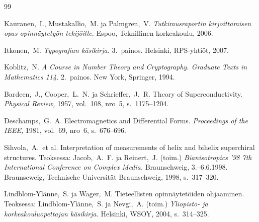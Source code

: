 \documentclass[english,12pt,a4paper,pdftex,sci,utf8]{aaltothesis}
\begin{document}
{}
\begin{thebibliography}{99}

 Kauranen,\ I., Mustakallio,\ M. ja Palmgren,\ V.
  \textit{Tutkimusraportin kirjoittamisen opas opinn\"aytety\"on
    tekij\"oille.}  Espoo, Teknillinen korkeakoulu, 2006.

 Itkonen,\ M. \textit{Typografian k\"asikirja.} 3.\
  painos.  Helsinki, RPS-yhti\"ot, 2007.

 Koblitz,\ N. \textit{A Course in Number Theory and
    Cryptography. Graduate Texts in Mathematics 114.}  2.\ painos. New
  York, Springer, 1994.

\bibitem{bcs} Bardeen,\ J., Cooper,\ L.\ N. ja Schrieffer,\ J.\ R.
  Theory of Superconductivity. \textit{Physical Review,} 1957, vol.\
  108, nro~5, s.\ 1175--1204.

 Deschamps,\ G.\ A. Electromagnetics and
  Differential Forms. \textit{Proceedings of the IEEE,} 1981, vol.\
  69, nro~6, s.\ 676--696.

\bibitem{Sihvola} Sihvola,\ A.\ et al.
  Interpretation of measurements of helix 
    and bihelix superchiral structures.
  Teoksessa: Jacob,\ A.\ F. ja
  Reinert,\ J. (toim.) \textit{Bianisotropics '98 7th International
    Conference on Complex Media.}  Braunschweig, 3.--6.6.1998.
  Braunscweig, Technische Universit\"at Braunschweig, 1998, s.\
  317--320.

 Lindblom-Yl\"anne,\ S. ja Wager,\ M.  Tieteellisten
  opinn\"aytet\"oiden ohjaaminen. Teoksessa: Lindblom-Yl\"anne,\ S. ja
  Nevgi,\ A. (toim.) \textit{Yliopisto- ja korkeakouluopettajan
    k\"asikirja.}  Helsinki, WSOY, 2004, s.\ 314--325.
 

\end{thebibliography}
\end{document}
